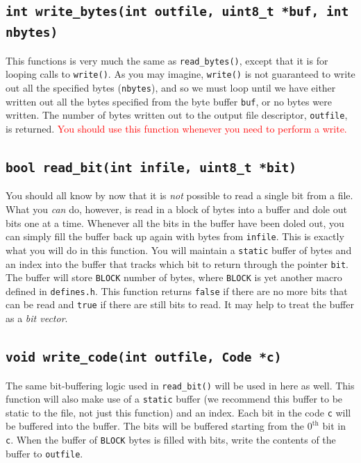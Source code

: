 \documentclass[11pt]{article}
\begin{document}
\subsection{\texttt{int write\_bytes(int outfile, uint8\_t *buf, int
nbytes)}}

This functions is very much the same as \texttt{read\_bytes()}, except
that it is for looping calls to \texttt{write()}. As you may imagine,
\texttt{write()} is not guaranteed to write out all the specified bytes
(\texttt{nbytes}), and so we must loop until we have either written out
all the bytes specified from the byte buffer \texttt{buf}, or no bytes
were written. The number of bytes written out to the output file
descriptor, \texttt{outfile}, is returned. \textcolor{red}{You should
  use this function whenever you need
  to perform a write.}

\subsection{\texttt{bool read\_bit(int infile, uint8\_t *bit)}}

You should all know by now that it is \emph{not} possible to read a
single bit from a file. What you \emph{can} do, however, is read in a
block of bytes into a buffer and dole out bits one at a time. Whenever
all the bits in the buffer have been doled out, you can simply fill the
buffer back up again with bytes from \texttt{infile}. This is exactly
what you will do in this function. You will maintain a \texttt{static}
buffer of bytes and an index into the buffer that tracks which bit to
return through the pointer \texttt{bit}. The buffer will store
\texttt{BLOCK} number of bytes, where \texttt{BLOCK} is yet another
macro defined in \texttt{defines.h}. This function returns
\texttt{false} if there are no more bits that can be read and
\texttt{true} if there are still bits to read. It may help to treat the
buffer as a \emph{bit vector}.

\subsection{\texttt{void write\_code(int outfile, Code *c)}}

The same bit-buffering logic used in \texttt{read\_bit()} will be used
in here as well. This function will also make use of a \texttt{static}
buffer (we recommend this buffer to be static to the file, not just this
function) and an index. Each bit in the code \texttt{c} will be buffered
into the buffer. The bits will be buffered starting from the
$0^\text{th}$ bit in \texttt{c}. When the buffer of \texttt{BLOCK} bytes
is filled with bits, write the contents of the buffer to
\texttt{outfile}.
\end{document}
